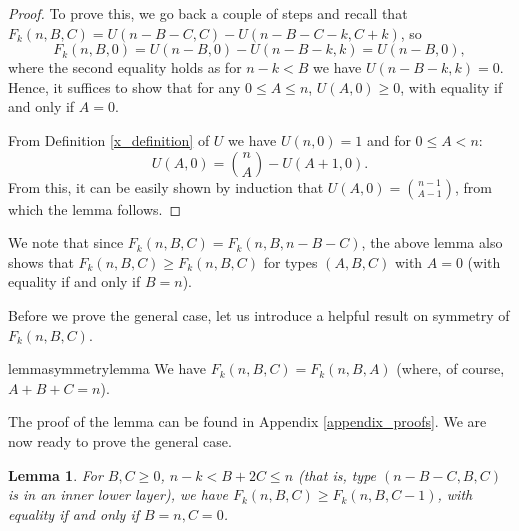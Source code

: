 \documentclass[11pt, reqno]{amsart}
\newtheorem{lemma}[theorem]{Lemma}
\numberwithin{equation}{section}
\begin{document}
\begin{proof}
    To prove this, we go back a couple of steps and recall that $F_k(n, B, C)=U(n-B-C, C)-U(n-B-C-k, C+k)$, so
    \begin{equation}
        F_k(n, B, 0)=U(n-B, 0) - U(n-B-k, k)=U(n-B, 0),
    \end{equation}
    where the second equality holds as for $n-k<B$ we have $U(n-B-k, k)=0$. Hence, it suffices to show that for any $0 \leqslant A \leqslant n$, $U(A, 0) \geqslant 0$, with equality if and only if $A=0$.

    From Definition \ref{x_definition} of $U$ we have $U(n, 0)=1$ and for $0 \leqslant A<n$:
    \begin{equation}
        U(A, 0) = \binom{n}{A} - U(A+1, 0).
    \end{equation}
    From this, it can be easily shown by induction that $U(A, 0)=\binom{n-1}{A-1}$, from which the lemma follows.
\end{proof}

We note that since $F_k(n, B, C)=F_k(n, B, n-B-C)$, the above lemma also shows that $F_k(n, B, C) \geqslant F_k(n, B, C)$ for types $(A, B, C)$ with $A=0$ (with equality if and only if $B=n$).

Before we prove the general case, let us introduce a helpful result on symmetry of $F_k(n, B, C)$.

\begin{restatable}{lemma}{symmetrylemma}
\label{symmetry_lemma}
    We have $F_k(n, B, C) = F_k(n, B, A)$ (where, of course, $A+B+C=n$).
\end{restatable}

The proof of the lemma can be found in Appendix \ref{appendix_proofs}. We are now ready to prove the general case.

\begin{lemma}
    For $B, C \geqslant 0$, $n-k < B+2C \leqslant n$ (that is, type $(n-B-C, B, C)$ is in an inner lower layer), we have $F_k(n, B, C) \geqslant F_k(n, B, C-1)$, with equality if and only if $B=n, C=0$.
\end{lemma}
\end{document}
